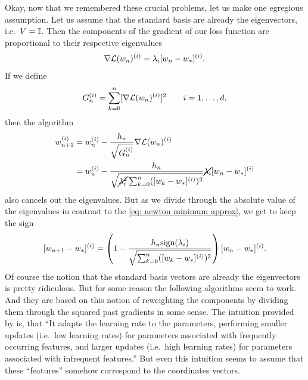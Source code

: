 Okay, now that we remembered these crucial problems, let us make one egregious
assumption. Let us assume that the standard basis are already the eigenvectors,
i.e.\ \(V=\mathbb{I}\). Then the components of the gradient of our loss function
are proportional to their respective eigenvalues
\begin{align*}
	\nabla\mathcal{L}(w_n)^{(i)}
	= \lambda_i [w_n - w_*]^{(i)}.
\end{align*}
If we define
\begin{align*}
	G_n^{(i)} = \sum_{k=0}^n [\nabla\mathcal{L}(w_n)^{(i)}]^2 \qquad i=1,\dots,d,
\end{align*}
then the algorithm
\begin{align}
	\label{eq: almost adagrad}
	w_{n+1}^{(i)}
	&= w_n^{(i)} - \frac{h_n}{\sqrt{G_n^{(i)}}}\nabla\mathcal{L}(w_n)^{(i)}\\
	\nonumber
	&= w_n^{(i)} - \frac{h_n}{
		\sqrt{\cancel{\lambda_i^2}\sum_{k=0}^n([w_k - w_*]^{(i)})^2}
	}
	\cancel{\lambda_i}[w_n - w_*]^{(i)}
\end{align}
also cancels out the eigenvalues. But as we divide through the absolute value of
the eigenvalues in contrast to the \ref{eq: newton minimum approx}, we get to
keep the sign
\begin{align}\label{eq: adagrad motivation contraction}
	[w_{n+1}-w_*]^{(i)} = \left(1-\frac{h_n\text{sign}(\lambda_i)}{
			\sqrt{\sum_{k=0}^n([w_k - w_*]^{(i)})^2}
		}\right)[w_n - w_*]^{(i)}.
\end{align}
Of course the notion that the standard basis vectors are already the eigenvectors
is pretty ridiculous. But for some reason the following algorithms seem to
work. And they are based on this notion of reweighting the components
by dividing them through the squared past gradients in some sense. The intuition
provided by \textcite{ruderOverviewGradientDescent2017} is, that
``It adapts the learning rate to the parameters, performing smaller updates
(i.e.\ low learning rates) for parameters associated with frequently occurring
features, and larger updates (i.e.\ high learning rates) for parameters
associated with infrequent features.'' But even this intuition seems to assume
that these ``features'' somehow correspond to the coordinates vectors.

